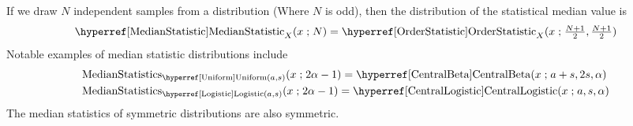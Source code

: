 

 If we draw $N$ independent samples from a distribution (Where $N$ is odd), then the distribution of the statistical median value is 
\label{MedianStatistic}
\begin{align*}
\opr{MedianStatistic}_{X}(x \given N) = \opr{OrderStatistic}_{X}(x \given \tfrac{N+1}{2},  \tfrac{N+1}{2})
\checked
\end{align*}
Notable examples of median statistic distributions include
\begin{align*}
\op{MedianStatistics}&_{\opr{Uniform}(a,s)}(x \given 2 \alpha - 1 )
=  \opr{CentralBeta}(x\given a+s, 2s, \alpha)
\checked
\\
\op{MedianStatistics}&_{\opr{Logistic}(a,s)}  (x \given 2 \alpha - 1)
=  \opr{CentralLogistic}(x\given a, s, \alpha)
\checked
\end{align*}
The median statistics of symmetric distributions are also symmetric.



